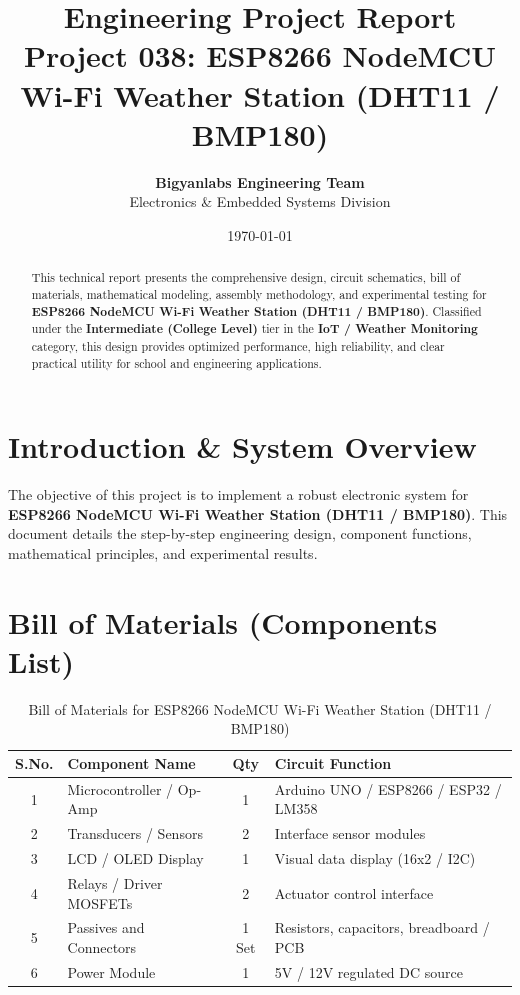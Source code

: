 \documentclass[11pt,a4paper]{article}
\title{\textbf{\Huge Engineering Project Report}\\[0.5em] \Large Project 038: ESP8266 NodeMCU Wi-Fi Weather Station (DHT11 / BMP180)}
\author{\textbf{Bigyanlabs Engineering Team}\\ Electronics \& Embedded Systems Division}
\date{\today}
\begin{document}
\maketitle
\thispagestyle{empty}

\begin{abstract}
This technical report presents the comprehensive design, circuit schematics, bill of materials, mathematical modeling, assembly methodology, and experimental testing for \textbf{ESP8266 NodeMCU Wi-Fi Weather Station (DHT11 / BMP180)}. Classified under the \textbf{Intermediate (College Level)} tier in the \textbf{IoT / Weather Monitoring} category, this design provides optimized performance, high reliability, and clear practical utility for school and engineering applications.
\end{abstract}

\newpage
\tableofcontents
\newpage

\section{Introduction \& System Overview}
The objective of this project is to implement a robust electronic system for \textbf{ESP8266 NodeMCU Wi-Fi Weather Station (DHT11 / BMP180)}. This document details the step-by-step engineering design, component functions, mathematical principles, and experimental results.

\section{Bill of Materials (Components List)}
\begin{table}[h!]
\centering
\caption{Bill of Materials for ESP8266 NodeMCU Wi-Fi Weather Station (DHT11 / BMP180)}
\vspace{0.5em}
\begin{tabular}{clcp{7cm}}
\toprule
\textbf{S.No.} & \textbf{Component Name} & \textbf{Qty} & \textbf{Circuit Function} \\
\midrule
1 & Microcontroller / Op-Amp & 1 & Arduino UNO / ESP8266 / ESP32 / LM358 \\
2 & Transducers / Sensors & 2 & Interface sensor modules \\
3 & LCD / OLED Display & 1 & Visual data display (16x2 / I2C) \\
4 & Relays / Driver MOSFETs & 2 & Actuator control interface \\
5 & Passives and Connectors & 1 Set & Resistors, capacitors, breadboard / PCB \\
6 & Power Module & 1 & 5V / 12V regulated DC source \\
\bottomrule
\end{tabular}
\end{table}
\end{document}
